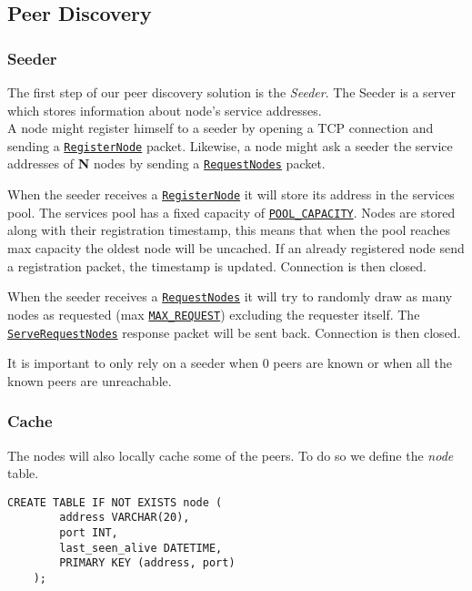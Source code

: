 \documentclass[../documentation.tex]{subfiles}
\begin{document}
\newcommand{\const}[1]{\hyperlink{constants}{\texttt{#1}}}
\newcommand{\packet}[1]{\hyperlink{packets}{\texttt{#1}}}

\subsection{Peer Discovery}

\subsubsection{Seeder}

The first step of our peer discovery solution is the \textit{Seeder}.
The Seeder is a server which stores information about node's service addresses.
\\
A node might register himself to a seeder by opening a TCP connection and sending
a \packet{RegisterNode} packet.
Likewise, a node might ask a seeder the service addresses of \textbf{N} nodes by sending a
\packet{RequestNodes} packet.

When the seeder receives a \packet{RegisterNode} it will store its address in the
services pool. The services pool has a fixed capacity of \const{POOL\_CAPACITY}.
Nodes are stored along with their registration timestamp, this means that when the pool
reaches max capacity the oldest node will be uncached. If an already registered node
send a registration packet, the timestamp is updated.
Connection is then closed.

When the seeder receives a \packet{RequestNodes} it will try to randomly draw
as many nodes as requested (max \const{MAX\_REQUEST}) excluding the requester itself.
The \packet{ServeRequestNodes} response packet will be sent back.
Connection is then closed.

It is important to only rely on a seeder when 0 peers are known or when all
the known peers are unreachable.

\subsubsection{Cache}

The nodes will also locally cache some of the peers.
To do so we define the \textit{node} table.

\begin{lstlisting}[style=sql]
    CREATE TABLE IF NOT EXISTS node (
        address VARCHAR(20),
        port INT,
        last_seen_alive DATETIME,
        PRIMARY KEY (address, port)
    );
\end{lstlisting}
\end{document}

